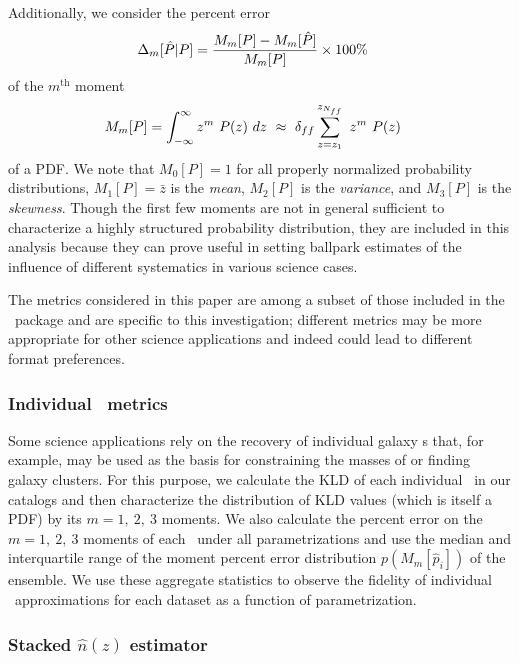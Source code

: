 Additionally, we consider the percent error
\begin{align}
\eqlabel{eq:percent_error}
\Delta_{m}[\hat{P} | P] &= \frac{M_{m}[P] - 
	M_{m}[\hat{P}]}{M_{m}[P]}\times100\%
\end{align}
of the $m^{\mathrm{th}}$ moment
\begin{align}
\eqlabel{eq:moment}
M_{m}[P] &= \int_{-\infty}^{\infty} z^{m}\ P(z)\ dz\ \approx\  
\delta_{ff}\sum_{z=z_{1}}^{z_{N_{ff}}}\ z^{m}\ P(z)
\end{align}
of a PDF.
We note that $M_{0}[P]=1$ for all properly normalized probability 
distributions, $M_{1}[P]=\bar{z}$ is the \textit{mean}, $M_{2}[P]$ is the 
\textit{variance}, and $M_{3}[P]$ is the \textit{skewness}.
Though the first few moments are not in general sufficient to characterize a 
highly structured probability distribution, they are included in this analysis 
because they can prove useful in setting ballpark estimates of the influence of 
different systematics in various science cases.

The metrics considered in this paper are among a subset of those included in 
the \qp\ package and are specific to this investigation; different metrics may 
be more appropriate for other science applications and indeed could lead to 
different format preferences.

\subsubsection{Individual \pz\ metrics}

Some science applications rely on the recovery of individual galaxy \pz s that, 
for example, may be used as the basis for constraining the masses of 
\citep{applegate_weighing_2014} or finding \citep{radovich_searching_2017} 
galaxy clusters.
For this purpose, we calculate the KLD of each individual \pz\ in our catalogs 
and then characterize the distribution of KLD values (which is itself a PDF) by 
its $m=1,\ 2,\ 3$ moments.
We also calculate the percent error on the $m=1,\ 2,\ 3$ moments of each \pz\ 
under all parametrizations and use the median and interquartile range of the 
moment percent error distribution $p(M_{m}[\hat{p}_{i}])$ of the ensemble.
We use these aggregate statistics to observe the fidelity of individual \pz\ 
approximations for each dataset as a function of parametrization.

\subsubsection{Stacked $\hat{n}(z)$ estimator}
\sectlabel{sec:stacked_metric}

